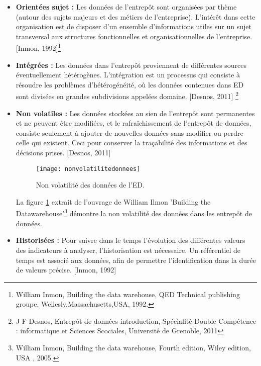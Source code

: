 \begin{itemize}
    \item \textbf{Orientées sujet :} Les données de l’entrepôt sont organisées par thème (autour des sujets majeurs et des métiers de l’entreprise). L’intérêt dans cette organisation est de disposer d’un ensemble d’informations utiles sur un sujet transversal aux structures fonctionnelles et organisationnelles de l’entreprise. [Inmon, 1992]\footnote{William Inmon, Building the data warehouse, QED Technical publishing groupe, Wellesly,Massachusetts,USA, 1992.}
    \item \textbf{Intégrées :} Les données dans l’entrepôt proviennent de différentes sources éventuellement hétérogènes. L’intégration est un processus qui consiste à résoudre les problèmes d’hétérogénéité, où les données contenues dans ED sont divisées en grandes subdivisions appelées domaine. [Desnos, 2011] \footnote{J F Desnos, Entrepôt de données-introduction, Spécialité Double Compétence : informatique et Sciences Scociales, Université de Grenoble, 2011}
    \item \textbf{Non volatiles :} Les données stockées au sien de l’entrepôt sont permanentes et ne peuvent être modifiées, et le rafraîchissement de l’entrepôt de données, consiste seulement à ajouter de nouvelles données sans modifier ou perdre celle qui existent. Ceci pour conserver la traçabilité des informations et des décisions prises. [Desnos, 2011]
    
    \begin{figure}[H]
        \centering
        \texttt{[image: nonvolatilitedonnees]}
        \caption{Non volatilité des données de l’ED.}
        \label{fig:composantsdudecisionnel}
    \end{figure}

    La figure \ref{fig:composantsdudecisionnel} extrait de l'ouvrage de William Ilmon 'Building the Datawarehouse'\footnote{William Inmon, Building the data warehouse, Fourth edition, Wiley edition, USA , 2005.} démontre la non volatilité des données dans les entrepôt de données.

    \item \textbf{Historisées :} Pour suivre dans le temps l’évolution des différentes valeurs des indicateurs à analyser, l’historisation est nécessaire. Un référentiel de temps est associé aux données, afin de permettre l’identification dans la durée de valeurs précise. [Inmon, 1992]
\end{itemize}


